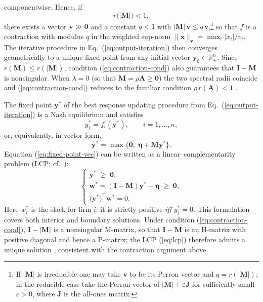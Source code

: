 componentwise. Hence, if
\begin{equation}
r\bigl(|\mathbf{M}|\bigr)<1,
\label{eq:contraction-cond}
\end{equation}
there exists a vector $\mathbf{v}\gg\mathbf{0}$ and a constant $q<1$ with $|\mathbf{M}|\,\mathbf{v}\le q\,\mathbf{v}$,\footnote{If $|\mathbf{M}|$ is irreducible one may take $\mathbf{v}$ to be its Perron vector and $q=r(|\mathbf{M}|)$; in the reducible case take the Perron vector of $|\mathbf{M}|+\varepsilon\mathbf{J}$ for sufficiently small $\varepsilon>0$, where $\mathbf{J}$ is the all-ones matrix.} so that $f$ is a contraction with modulus $q$ in the weighted sup-norm $\lVert\mathbf{x}\rVert_{\mathbf{v}}=\max_i |x_i|/v_i$. The iterative procedure in Eq.~(\ref{eq:output-iteration}) then converges geometrically to a unique fixed point from any initial vector $\mathbf{y}_0\in\mathbb{R}^n_+$. Since $r(\mathbf{M})\le r(|\mathbf{M}|)$, condition (\ref{eq:contraction-cond}) also guarantees that $\mathbf{I}-\mathbf{M}$ is nonsingular. When $\lambda=0$ (so that $\mathbf{M}=\rho\mathbf{A}\ge\mathbf{0}$) the two spectral radii coincide and (\ref{eq:contraction-cond}) reduces to the familiar condition $\rho\,r(\mathbf{A})<1$ \citep[cf.][]{ballester06:_who_networ}.

The fixed point $\mathbf y^{\ast}$ of the best response updating procedure from Eq.~(\ref{eq:output-iteration}) is a Nash equilibrium and satisfies
\begin{equation}
y_i^{\ast}=f_i(\mathbf y^{\ast}),
\qquad i=1,\dots ,n,
\label{eq:fixed-point}
\end{equation}
or, equivalently, in vector form,
\begin{equation}
\mathbf y^{\ast}=\max\!\bigl\{\mathbf 0,\;\boldsymbol{\eta}+\mathbf{M}\mathbf y^{\ast}\bigr\}.
\label{eq:fixed-point-vec}
\end{equation}
Equation (\ref{eq:fixed-point-vec}) can be written as a linear--complementarity problem (LCP; cf.\ \citet{Cottle1992}):
\begin{equation}
\begin{cases}
\mathbf y^{\ast}\;\ge\;\mathbf 0,\\[2pt]
\mathbf w^{\ast}=(\mathbf{I}-\mathbf{M})\mathbf y^{\ast}-\boldsymbol{\eta}\;\ge\;\mathbf 0,\\[2pt]
\bigl(\mathbf y^{\ast}\bigr)^{\!\top}\mathbf w^{\ast}=0.
\end{cases}
\label{eq:lcp}
\end{equation}
Here $w^{\ast}_i$ is the slack for firm $i$: it is strictly positive \emph{iff} $y_i^{\ast}=0$. This formulation covers both interior and boundary solutions. Under condition (\ref{eq:contraction-cond}), $\mathbf{I}-|\mathbf{M}|$ is a nonsingular M-matrix, so that $\mathbf{I}-\mathbf{M}$ is an H-matrix with positive diagonal and hence a P-matrix; the LCP (\ref{eq:lcp}) therefore admits a unique solution \citep[Thm.~3.3.7]{Cottle1992}, consistent with the contraction argument above.

